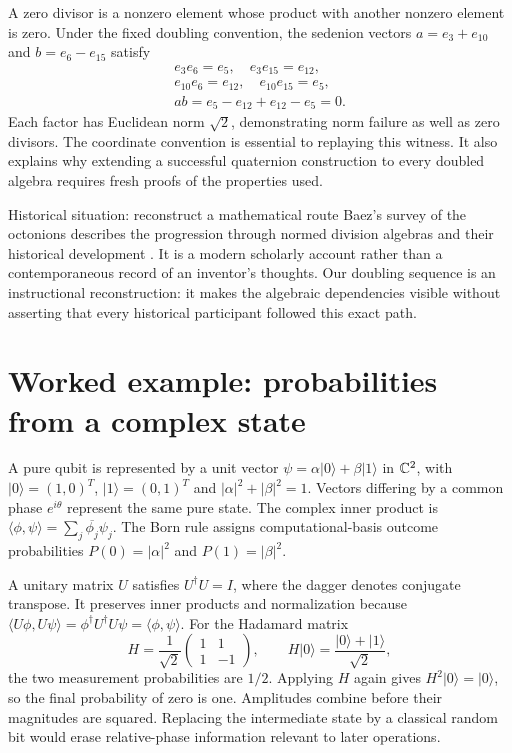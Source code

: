 A zero divisor is a nonzero element whose product with another nonzero
element is zero. Under the fixed doubling convention, the sedenion vectors
$a=e_3+e_{10}$ and $b=e_6-e_{15}$ satisfy
\[
 \begin{gathered}
 e_3e_6=e_5,\quad e_3e_{15}=e_{12},\\
 e_{10}e_6=e_{12},\quad e_{10}e_{15}=e_5,\\
 ab=e_5-e_{12}+e_{12}-e_5=0.
 \end{gathered}
\]
Each factor has Euclidean norm $\sqrt2$, demonstrating norm failure as well
as zero divisors. The coordinate convention is essential to replaying this
witness. It also explains why extending a successful quaternion construction
to every doubled algebra requires fresh proofs of the properties used.

\begin{learningcard}[breakable=false]{Historical situation: reconstruct a mathematical route}
Baez's survey of the octonions describes the progression through normed
division algebras and their historical development \citep{baez2001octonions}.
It is a modern scholarly account rather than a contemporaneous record of
an inventor's thoughts. Our doubling sequence is an instructional
reconstruction: it makes the algebraic dependencies visible without
asserting that every historical participant followed this exact path.
\end{learningcard}



\clearpage
\section{Worked example: probabilities from a complex state}
\label{learn:quantum}

A pure qubit is represented by a unit vector
$\psi=\alpha|0\rangle+\beta|1\rangle$ in $\mathbb{C}^2$, with
$|0\rangle=(1,0)^T$, $|1\rangle=(0,1)^T$ and
$|\alpha|^2+|\beta|^2=1$. Vectors differing by a common phase
$e^{i\theta}$ represent the same pure state. The complex inner product is
$\langle\phi,\psi\rangle=\sum_j\overline{\phi_j}\psi_j$.
The Born rule assigns computational-basis outcome probabilities
$P(0)=|\alpha|^2$ and $P(1)=|\beta|^2$.

A unitary matrix $U$ satisfies $U^\dagger U=I$, where the dagger denotes
conjugate transpose. It preserves inner products and normalization because
$\langle U\phi,U\psi\rangle=\phi^\dagger U^\dagger U\psi
=\langle\phi,\psi\rangle$. For the Hadamard matrix
\[
 H=\frac1{\sqrt2}\begin{pmatrix}1&1\\1&-1\end{pmatrix},\qquad
 H|0\rangle=\frac{|0\rangle+|1\rangle}{\sqrt2},
\]
the two measurement probabilities are $1/2$. Applying $H$ again gives
$H^2|0\rangle=|0\rangle$, so the final probability of zero is one.
Amplitudes combine before their magnitudes are squared. Replacing the
intermediate state by a classical random bit would erase relative-phase
information relevant to later operations.


